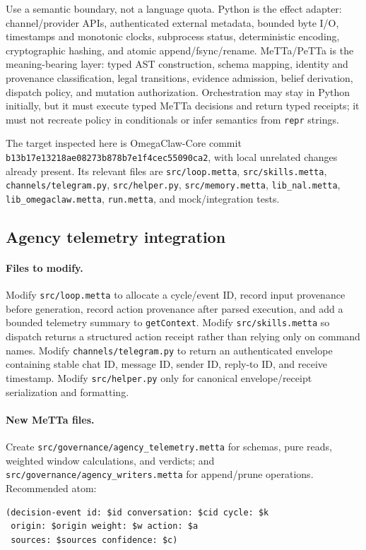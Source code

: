 \documentclass[11pt]{article}
\begin{document}
Use a semantic boundary, not a language quota.  Python is the effect adapter:
channel/provider APIs, authenticated external metadata, bounded byte I/O,
timestamps and monotonic clocks, subprocess status, deterministic encoding,
cryptographic hashing, and atomic append/fsync/rename.  MeTTa/PeTTa is the
meaning-bearing layer: typed AST construction, schema mapping, identity and
provenance classification, legal transitions, evidence admission, belief
derivation, dispatch policy, and mutation authorization.  Orchestration may stay
in Python initially, but it must execute typed MeTTa decisions and return typed
receipts; it must not recreate policy in conditionals or infer semantics from
\texttt{repr} strings.

The target inspected here is OmegaClaw-Core commit
\texttt{b13b17e13218ae08273b878b7e1f4cec55090ca2}, with local unrelated changes
already present.  Its relevant files are \texttt{src/loop.metta},
\texttt{src/skills.metta}, \texttt{channels/telegram.py}, \texttt{src/helper.py},
\texttt{src/memory.metta}, \texttt{lib\_nal.metta},
\texttt{lib\_omegaclaw.metta}, \texttt{run.metta}, and mock/integration tests.

\subsection{Agency telemetry integration}

\paragraph{Files to modify.}
Modify \texttt{src/loop.metta} to allocate a cycle/event ID, record input
provenance before generation, record action provenance after parsed execution,
and add a bounded telemetry summary to \texttt{getContext}.  Modify
\texttt{src/skills.metta} so dispatch returns a structured action receipt rather
than relying only on command names.  Modify \texttt{channels/telegram.py} to
return an authenticated envelope containing stable chat ID, message ID, sender
ID, reply-to ID, and receive timestamp.  Modify \texttt{src/helper.py} only for
canonical envelope/receipt serialization and formatting.

\paragraph{New MeTTa files.}
Create \texttt{src/governance/agency\_telemetry.metta} for schemas, pure reads,
weighted window calculations, and verdicts; and
\texttt{src/governance/agency\_writers.metta} for append/prune operations.
Recommended atom:
\begin{lstlisting}
(decision-event id: $id conversation: $cid cycle: $k
 origin: $origin weight: $w action: $a
 sources: $sources confidence: $c)
\end{lstlisting}
\end{document}
